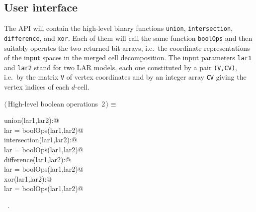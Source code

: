 \documentclass[11pt,oneside]{article}	%
\begin{document}
\subsection{User interface}

The API will contain the high-level binary functions \texttt{union}, \texttt{intersection}, \texttt{difference}, and \texttt{xor}. Each of them will call the same function \texttt{boolOps} and then suitably operates the two returned bit arrays, i.e.~the coordinate representations of the input spaces in the merged cell decomposition. The input parameters \texttt{lar1} and  \texttt{lar2} stand for two LAR models, each one constituted by a pair \texttt{(V,CV)}, i.e.~by the matrix \texttt{V} of vertex coordinates and by an integer array \texttt{CV} giving the vertex indices of each $d$-cell.

\begin{flushleft} \small \label{scrap1}
\protect{}$\langle\,$High-level boolean operations\nobreak\ {\footnotesize 2}$\,\rangle\equiv$
\vspace{-1ex}
\begin{list}{}{} \item
\mbox{}\verb@def union(lar1,lar2):@\\
\mbox{}\verb@   lar = boolOps(lar1,lar2)@\\
\mbox{}\verb@def intersection(lar1,lar2):@\\
\mbox{}\verb@   lar = boolOps(lar1,lar2)@\\
\mbox{}\verb@def difference(lar1,lar2):@\\
\mbox{}\verb@   lar = boolOps(lar1,lar2)@\\
\mbox{}\verb@def xor(lar1,lar2):@\\
\mbox{}\verb@   lar = boolOps(lar1,lar2)@\\
\mbox{}\verb@@{\NWsep}
\end{list}
\vspace{-1ex}
\footnotesize\addtolength{\baselineskip}{-1ex}
\begin{list}{}{\setlength{\itemsep}{-\parsep}\setlength{\itemindent}{-\leftmargin}}
\item \NWtxtMacroRefIn\ .
\end{list}
\end{flushleft}
\end{document}
